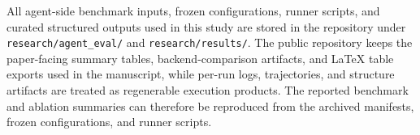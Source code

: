 All agent-side benchmark inputs, frozen configurations, runner scripts, and curated structured outputs used in this study are stored in the repository under \texttt{research/agent\_eval/} and \texttt{research/results/}. The public repository keeps the paper-facing summary tables, backend-comparison artifacts, and LaTeX table exports used in the manuscript, while per-run logs, trajectories, and structure artifacts are treated as regenerable execution products. The reported benchmark and ablation summaries can therefore be reproduced from the archived manifests, frozen configurations, and runner scripts.
